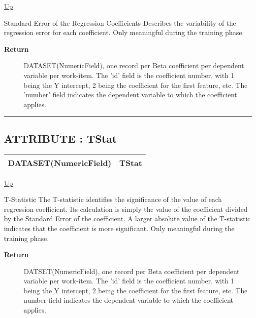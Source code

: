 \hyperlink{ecldoc:linearregression.ols}{Up}

\par
Standard Error of the Regression Coefficients Describes the variability of the regression error for each coefficient. Only meaningful during the training phase.

\par
\begin{description}
\item [\textbf{Return}] DATASET(NumericField), one record per Beta coefficient per dependent variable per work-item. The 'id' field is the coefficient number, with 1 being the Y intercept, 2 being the coefficient for the first feature, etc. The 'number' field indicates the dependent variable to which the coefficient applies.
\end{description}

\rule{\textwidth}{0.4pt}
\subsection*{ATTRIBUTE : TStat}
\hypertarget{ecldoc:linearregression.ols.tstat}{}

{\renewcommand{\arraystretch}{1.5}
\begin{tabularx}{\textwidth}{|>{\raggedright\arraybackslash}l|X|}
\hline
\hspace{0pt}DATASET(NumericField) & TStat \\
\hline
\end{tabularx}
}

\hyperlink{ecldoc:linearregression.ols}{Up}

\par
T-Statistic The T-statistic identifies the significance of the value of each regression coefficient. Its calculation is simply the value of the coefficient divided by the Standard Error of the coefficient. A larger absolute value of the T-statistic indicates that the coefficient is more significant. Only meaningful during the training phase.

\par
\begin{description}
\item [\textbf{Return}] DATSET(NumericField), one record per Beta coefficient per dependent variable per work-item. The 'id' field is the coefficient number, with 1 being the Y intercept, 2 being the coefficient for the first feature, etc. The number field indicates the dependent variable to which the coefficient applies.
\end{description}

